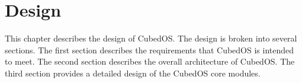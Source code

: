 
\newpage
\chapter{Design}
\label{chapt:design}

This chapter describes the design of CubedOS. The design is broken into several sections. The
first section describes the requirements that CubedOS is intended to meet. The second section
describes the overall architecture of CubedOS. The third section provides a detailed design of
the CubedOS core modules.




